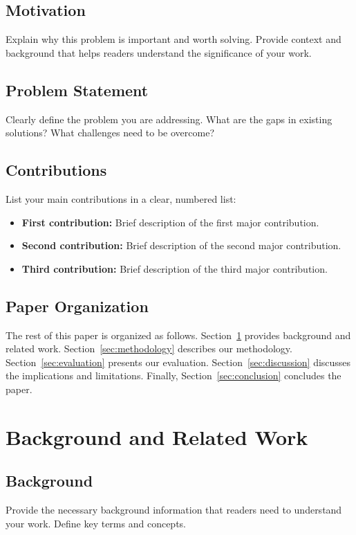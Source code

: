 \documentclass[10pt,conference]{IEEEtran}
\begin{document}
\subsection{Motivation}
Explain why this problem is important and worth solving. Provide context and background that helps readers understand the significance of your work.

\subsection{Problem Statement}
Clearly define the problem you are addressing. What are the gaps in existing solutions? What challenges need to be overcome?

\subsection{Contributions}
List your main contributions in a clear, numbered list:
\begin{itemize}
    \item \textbf{First contribution:} Brief description of the first major contribution.
    \item \textbf{Second contribution:} Brief description of the second major contribution.
    \item \textbf{Third contribution:} Brief description of the third major contribution.
\end{itemize}

\subsection{Paper Organization}
The rest of this paper is organized as follows. Section~\ref{sec:background} provides background and related work. Section~\ref{sec:methodology} describes our methodology. Section~\ref{sec:evaluation} presents our evaluation. Section~\ref{sec:discussion} discusses the implications and limitations. Finally, Section~\ref{sec:conclusion} concludes the paper.

\section{Background and Related Work}
\label{sec:background}

\subsection{Background}
Provide the necessary background information that readers need to understand your work. Define key terms and concepts.
\end{document}
